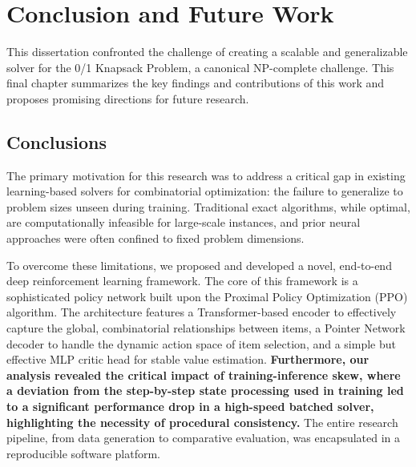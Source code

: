 

% 
% 


\chapter{Conclusion and Future Work}
\label{chap:conclusion_future_work}

This dissertation confronted the challenge of creating a scalable and generalizable solver for the 0/1 Knapsack Problem, a canonical NP-complete challenge. This final chapter summarizes the key findings and contributions of this work and proposes promising directions for future research.

\section{Conclusions}
\label{sec:conclusions}

The primary motivation for this research was to address a critical gap in existing learning-based solvers for combinatorial optimization: the failure to generalize to problem sizes unseen during training. Traditional exact algorithms, while optimal, are computationally infeasible for large-scale instances, and prior neural approaches were often confined to fixed problem dimensions.

To overcome these limitations, we proposed and developed a novel, end-to-end deep reinforcement learning framework. The core of this framework is a sophisticated policy network built upon the Proximal Policy Optimization (PPO) algorithm. The architecture features a Transformer-based encoder to effectively capture the global, combinatorial relationships between items, a Pointer Network decoder to handle the dynamic action space of item selection, and a simple but effective MLP critic head for stable value estimation. \textbf{Furthermore, our analysis revealed the critical impact of training-inference skew, where a deviation from the step-by-step state processing used in training led to a significant performance drop in a high-speed batched solver, highlighting the necessity of procedural consistency.} The entire research pipeline, from data generation to comparative evaluation, was encapsulated in a reproducible software platform.

